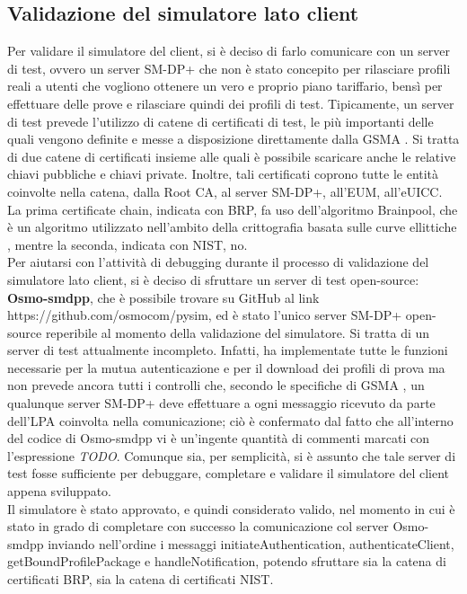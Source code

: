 \documentclass[10pt, oneside]{book}
\begin{document}
\subsection{Validazione del simulatore lato client}
Per validare il simulatore del client, si è deciso di farlo comunicare con un server di test, ovvero un server SM-DP+ che non è stato concepito per rilasciare profili reali a utenti che vogliono ottenere un vero e proprio piano tariffario, bensì per effettuare delle prove e rilasciare quindi dei profili di test. Tipicamente, un server di test prevede l'utilizzo di catene di certificati di test, le più importanti delle quali vengono definite e messe a disposizione direttamente dalla GSMA \cite{GSMA-test-cert}. Si tratta di due catene di certificati insieme alle quali è possibile scaricare anche le relative chiavi pubbliche e chiavi private. Inoltre, tali certificati coprono tutte le entità coinvolte nella catena, dalla Root CA, al server SM-DP+, all'EUM, all'eUICC. La prima certificate chain, indicata con BRP, fa uso dell'algoritmo Brainpool, che è un algoritmo utilizzato nell'ambito della crittografia basata sulle curve ellittiche \cite{RFC-5639}, mentre la seconda, indicata con NIST, no.\\
Per aiutarsi con l'attività di debugging durante il processo di validazione del simulatore lato client, si è deciso di sfruttare un server di test open-source: \textbf{Osmo-smdpp}, che è possibile trovare su GitHub al link https://github.com/osmocom/pysim, ed è stato l'unico server SM-DP+ open-source reperibile al momento della validazione del simulatore. Si tratta di un server di test attualmente incompleto. Infatti, ha implementate tutte le funzioni necessarie per la mutua autenticazione e per il download dei profili di prova ma non prevede ancora tutti i controlli che, secondo le specifiche di GSMA \cite{GSMA-docs-new}, un qualunque server SM-DP+ deve effettuare a ogni messaggio ricevuto da parte dell'LPA coinvolta nella comunicazione; ciò è confermato dal fatto che all'interno del codice di Osmo-smdpp vi è un'ingente quantità di commenti marcati con l'espressione \textit{TODO}. Comunque sia, per semplicità, si è assunto che tale server di test fosse sufficiente per debuggare, completare e validare il simulatore del client appena sviluppato.\\
Il simulatore è stato approvato, e quindi considerato valido, nel momento in cui è stato in grado di completare con successo la comunicazione col server Osmo-smdpp inviando nell'ordine i messaggi initiateAuthentication, authenticateClient, getBoundProfilePackage e handleNotification, potendo sfruttare sia la catena di certificati BRP, sia la catena di certificati NIST.
\end{document}
